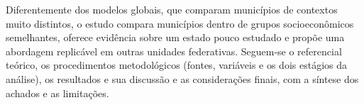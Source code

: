 Diferentemente dos modelos globais, que comparam municípios de contextos muito distintos, o estudo compara municípios dentro de grupos socioeconômicos semelhantes, oferece evidência sobre um estado pouco estudado e propõe uma abordagem replicável em outras unidades federativas. Seguem-se o referencial teórico, os procedimentos metodológicos (fontes, variáveis e os dois estágios da análise), os resultados e sua discussão e as considerações finais, com a síntese dos achados e as limitações.

